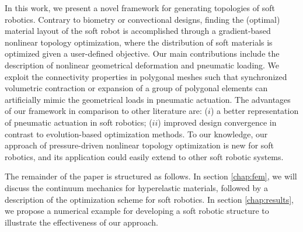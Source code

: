 In this work, we present a novel framework for generating topologies of soft robotics. Contrary to biometry or convectional designs, finding the (optimal) material layout of the soft robot is accomplished through a gradient-based nonlinear topology optimization, where the distribution of soft materials is optimized given a user-defined objective. Our main contributions include the description of nonlinear geometrical deformation and pneumatic loading. We exploit the connectivity properties in polygonal meshes such that synchronized volumetric contraction or expansion of a group of polygonal elements can artificially mimic the geometrical loads in pneumatic actuation. The advantages of our framework in comparison to other literature are: ($i$) a better representation of pneumatic actuation in soft robotics; ($ii$) improved design convergence in contrast to evolution-based optimization methods. To our knowledge, our approach of pressure-driven nonlinear topology optimization is new for soft robotics, and its application could easily extend to other soft robotic systems. %

The remainder of the paper is structured as follows. In section \ref{chap:fem}, we will discuss the continuum mechanics for hyperelastic materials, followed by a description of the optimization scheme for soft robotics. In section \ref{chap:results}, we propose a numerical example for developing a soft robotic structure to illustrate the effectiveness of our approach.
